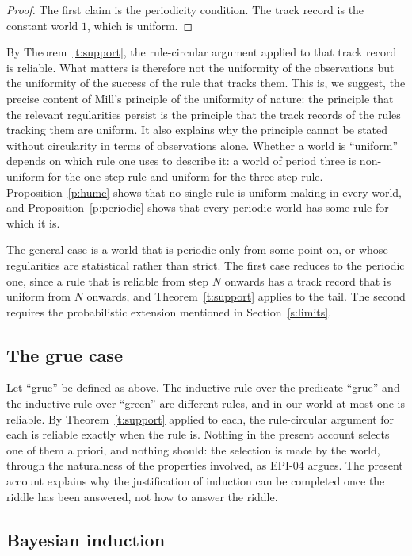 \documentclass{situationist-preprint}
\begin{document}
\begin{proof}
The first claim is the periodicity condition. The track record is the constant world $1$, which is uniform.
\end{proof}

By Theorem~\ref{t:support}, the rule-circular argument applied to that track record is reliable. What matters is therefore not the uniformity of the observations but the uniformity of the success of the rule that tracks them. This is, we suggest, the precise content of Mill's principle of the uniformity of nature: the principle that the relevant regularities persist is the principle that the track records of the rules tracking them are uniform. It also explains why the principle cannot be stated without circularity in terms of observations alone. Whether a world is \enquote{uniform} depends on which rule one uses to describe it: a world of period three is non-uniform for the one-step rule and uniform for the three-step rule. Proposition~\ref{p:hume} shows that no single rule is uniform-making in every world, and Proposition~\ref{p:periodic} shows that every periodic world has some rule for which it is.

The general case is a world that is periodic only from some point on, or whose regularities are statistical rather than strict. The first case reduces to the periodic one, since a rule that is reliable from step $N$ onwards has a track record that is uniform from $N$ onwards, and Theorem~\ref{t:support} applies to the tail. The second requires the probabilistic extension mentioned in Section~\ref{s:limits}.

\subsection{The grue case}

Let \enquote{grue} be defined as above. The inductive rule over the predicate \enquote{grue} and the inductive rule over \enquote{green} are different rules, and in our world at most one is reliable. By Theorem~\ref{t:support} applied to each, the rule-circular argument for each is reliable exactly when the rule is. Nothing in the present account selects one of them a priori, and nothing should: the selection is made by the world, through the naturalness of the properties involved, as EPI-04 argues. The present account explains why the justification of induction can be completed once the riddle has been answered, not how to answer the riddle.

\subsection{Bayesian induction}
\end{document}

